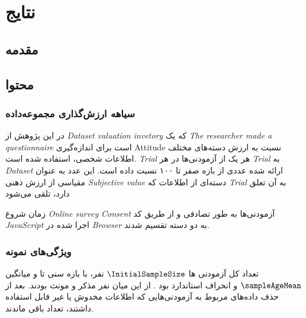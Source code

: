 \chapter{نتایج}
\label{chap:results}
\section{مقدمه}

\section{محتوا}
\subsection{سیاهه ارزش‌گذاری مجموعه‌داده}

در این پژوهش از
{\textit{\gls{Dataset valuation invetory}}}
که یک
{\textit{\gls{The researcher made a questionnaire}}}
است برای اندازه‌گیری
\gls{Attitude}
نسبت به ارزش دسته‌های مختلف اطلاعات شخصی، استفاده شده است.
\textit{\gls{Trial}}
هر یک از آزمودنی‌ها در هر
\textit{\gls{Trial}}
به
\textit{\gls{Dataset}}
ارائه شده عددی از بازه صفر تا ۱۰۰ نسبت داده است. این عدد به عنوان مقیاسی از ارزش ذهنی
\textit{\gls{Subjective value}}
دسته‌ای از اطلاعات که
\textit{\gls{Trial}}
به آن تعلق دارد، تلقی می‌شود

زمان شروع
\textit{\gls{Online survey}}
\textit{\gls{Consent}}
آزمودنی‌ها به طور تصادفی و از طریق کد
\textit{\gls{JavaScript}}
اجرا شده در
\textit{\gls{Browser}}
به دو دسته تقسیم شدند.
\subsection{ویژگی‌های نمونه}
تعداد کل آزمودنی ها
$\InitialSampleSize$
نفر،
با بازه سنی
\ageMin
تا
\ageMax
و 
میانگین
$\sampleAgeMean$
و انحراف استاندارد
\sampleAgeSD
بود
\!. 
از این میان 
\SampleSizeMale
نفر مذکر و 
\SampleSizeFemale
مونث بودند.
بعد از حذف داده‌های مربوط به آزمودنی‌هایی که اطلاعات مخدوش یا غیر قابل استفاده داشتند، تعداد
\CleanedSampleSize
باقی ماندند.

